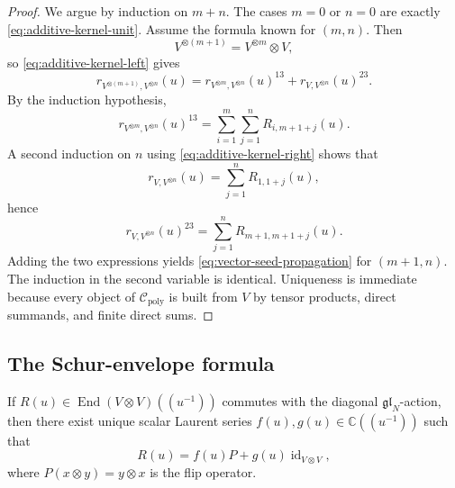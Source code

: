 \begin{proof}
We argue by induction on $m+n$. The cases $m=0$ or $n=0$ are exactly
\eqref{eq:additive-kernel-unit}. Assume the formula known for
$(m,n)$. Then
\begin{equation}
V^{\otimes(m+1)}=V^{\otimes m}\otimes V,
\end{equation}
so \eqref{eq:additive-kernel-left} gives
\begin{equation}
r_{V^{\otimes(m+1)},V^{\otimes n}}(u)
=
r_{V^{\otimes m},V^{\otimes n}}(u)^{13}
+
r_{V,V^{\otimes n}}(u)^{23}.
\end{equation}
By the induction hypothesis,
\begin{equation}
r_{V^{\otimes m},V^{\otimes n}}(u)^{13}
=
\sum_{i=1}^{m}\sum_{j=1}^{n}R_{i,m+1+j}(u).
\end{equation}
A second induction on $n$ using \eqref{eq:additive-kernel-right} shows
that
\begin{equation}
r_{V,V^{\otimes n}}(u)=\sum_{j=1}^n R_{1,1+j}(u),
\end{equation}
hence
\begin{equation}
r_{V,V^{\otimes n}}(u)^{23}
=
\sum_{j=1}^n R_{m+1,m+1+j}(u).
\end{equation}
Adding the two expressions yields \eqref{eq:vector-seed-propagation} for
$(m+1,n)$. The induction in the second variable is identical. Uniqueness
is immediate because every object of $\mathcal C_{\mathrm{poly}}$ is built
from $V$ by tensor products, direct summands, and finite direct sums.
\end{proof}

\subsection{The Schur-envelope formula}

\begin{lemma}
\ClaimStatusProvedHere
\label{lem:equivariant-normal-form}
If $R(u)\in \operatorname{End}(V\otimes V)((u^{-1}))$ commutes with the
diagonal $\mathfrak{gl}_N$-action, then there exist unique scalar Laurent
series $f(u),g(u)\in \mathbb C((u^{-1}))$ such that
\begin{equation}
R(u)=f(u)P+g(u)\operatorname{id}_{V\otimes V},
\end{equation}
where $P(x\otimes y)=y\otimes x$ is the flip operator.
\end{lemma}

